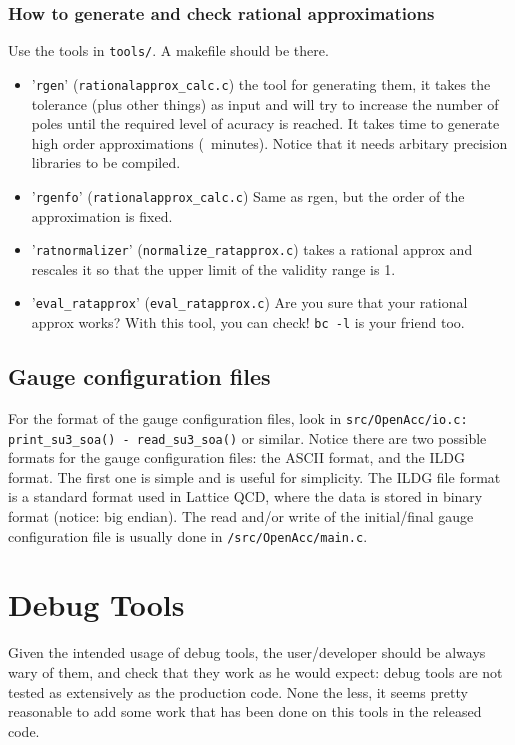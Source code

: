 \subsubsection{ How to generate and check rational approximations}
Use the tools in \verb|tools/|. A makefile should be there. 
\begin{itemize}
    \item '\verb|rgen|' (\verb|rationalapprox_calc.c|) 
        the tool for generating them, it takes the tolerance (plus other
        things) as input and will try to increase the number of poles until
        the required level of acuracy is reached. It takes time to generate
        high order approximations (~minutes). Notice that it needs arbitary
        precision libraries to be compiled.
    \item '\verb|rgenfo|' (\verb|rationalapprox_calc.c|) 
        Same as rgen, but the order of the approximation is fixed.
    \item '\verb|ratnormalizer|' (\verb|normalize_ratapprox.c|) 
        takes a rational approx and
        rescales it so that the upper limit of the validity range is 1.
    \item '\verb|eval_ratapprox|' (\verb|eval_ratapprox.c|)
        Are you sure that your rational approx works? With this tool, you
        can check! \verb|bc -l| is your friend too.
\end{itemize}

\subsection{Gauge configuration files}
For the format of the gauge configuration files, look in 
\verb|src/OpenAcc/io.c: print_su3_soa() - read_su3_soa()| or similar.
Notice there are two possible formats for the gauge configuration files: the 
ASCII format, and the ILDG format. The first one is simple and is useful for 
simplicity. The ILDG file format is a standard format used in Lattice QCD, 
where the data is stored in binary format (notice: big endian).  
The read and/or write of the initial/final gauge configuration file
is usually done in \verb|/src/OpenAcc/main.c|.


\section{Debug Tools}
Given the intended usage of debug tools, the user/developer should be always 
wary of them, and check that they work as he would expect: debug tools are not 
tested as extensively as the production code. None the less, it seems pretty
reasonable to add some work that has been done on this tools in the released 
code.
